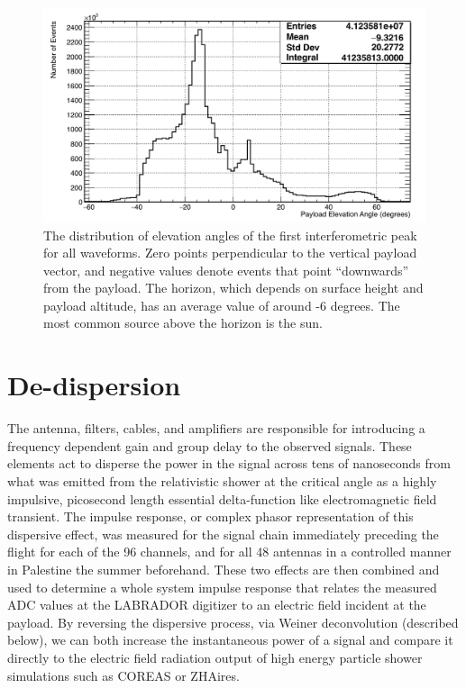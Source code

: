 \begin{figure}
	\centering
	\includegraphics[width=\textwidth]{figures/elevationAngle}
	\caption{The distribution of elevation angles of the first interferometric peak for all waveforms.  Zero points perpendicular to the vertical payload vector, and negative values denote events that point ``downwards'' from the payload.  The horizon, which depends on surface height and payload altitude, has an average value of around -6 degrees.  The most common source above the horizon is the sun.} 
	\label{fig:elevationAngle}
\end{figure}	 
		


\section{De-dispersion}
	The antenna, filters, cables, and amplifiers are responsible for introducing a frequency dependent gain and group delay to the observed signals.  These elements act to disperse the power in the signal across tens of nanoseconds from what was emitted from the relativistic shower at the critical angle as a highly impulsive, picosecond length essential delta-function like electromagnetic field transient.  The impulse response, or complex phasor representation of this dispersive effect, was measured for the signal chain immediately preceding the flight for each of the 96 channels, and for all 48 antennas in a controlled manner in Palestine the summer beforehand.  These two effects are then combined and used to determine a whole system impulse response that relates the measured ADC values at the LABRADOR digitizer to an electric field incident at the payload.  By reversing the dispersive process, via Weiner deconvolution (described below), we can both increase the instantaneous power of a signal and compare it directly to the electric field radiation output of high energy particle shower simulations such as COREAS or ZHAires.
